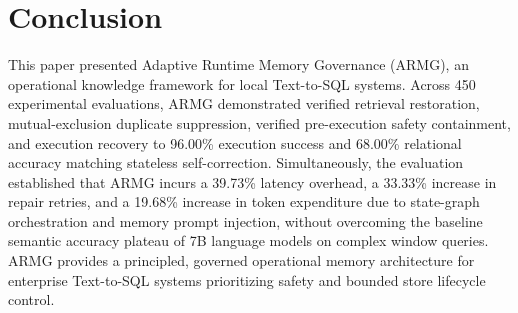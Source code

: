 \documentclass[conference]{IEEEtran}
\begin{document}
\section{Conclusion}
This paper presented Adaptive Runtime Memory Governance (ARMG), an operational knowledge framework for local Text-to-SQL systems. Across 450 experimental evaluations, ARMG demonstrated verified retrieval restoration, mutual-exclusion duplicate suppression, verified pre-execution safety containment, and execution recovery to 96.00\% execution success and 68.00\% relational accuracy matching stateless self-correction. Simultaneously, the evaluation established that ARMG incurs a 39.73\% latency overhead, a 33.33\% increase in repair retries, and a 19.68\% increase in token expenditure due to state-graph orchestration and memory prompt injection, without overcoming the baseline semantic accuracy plateau of 7B language models on complex window queries. ARMG provides a principled, governed operational memory architecture for enterprise Text-to-SQL systems prioritizing safety and bounded store lifecycle control.



\end{document}
